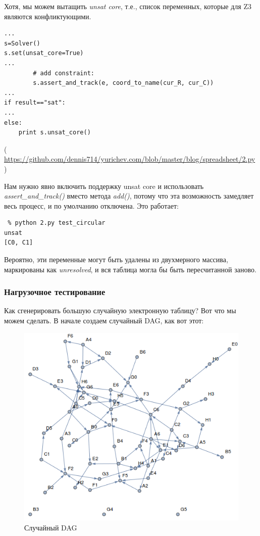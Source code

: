 Хотя, мы можем вытащить \textit{unsat core}, т.е., список переменных, которые для Z3 являются конфликтующими.

\begin{lstlisting}
...
s=Solver()
s.set(unsat_core=True)
...
        # add constraint:
        s.assert_and_track(e, coord_to_name(cur_R, cur_C))
...
if result=="sat":
...
else:
    print s.unsat_core()
\end{lstlisting}

( \url{https://github.com/dennis714/yurichev.com/blob/master/blog/spreadsheet/2.py} )

Нам нужно явно включить поддержку unsat core и использовать \textit{assert\_and\_track()} вместо метода \textit{add()},
потому что эта возможность замедляет весь процесс, и по умолчанию отключена.
Это работает:

\begin{lstlisting}
 % python 2.py test_circular
unsat
[C0, C1]
\end{lstlisting}

Вероятно, эти переменные могут быть удалены из двухмерного массива, маркированы как \textit{unresolved},
и вся таблица могла бы быть пересчитанной заново.

\subsubsection{Нагрузочное тестирование}

Как сгенерировать большую случайную электронную таблицу?
Вот что мы можем сделать.
В начале создаем случайный \ac{DAG}, как вот этот:

\begin{figure}[H]
\centering
\includegraphics[width=\textwidth]{SMT/spreadsheet/1.png}
\caption{Случайный DAG}
\end{figure}

